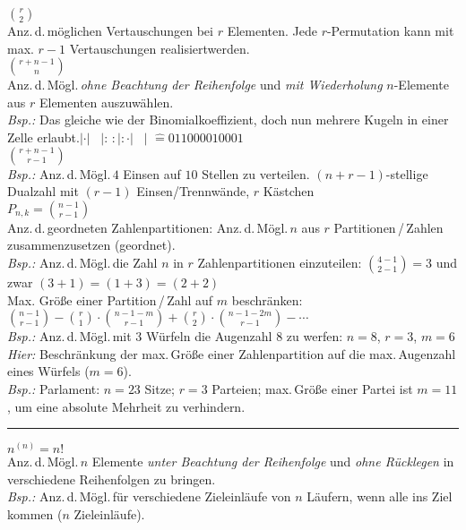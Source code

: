\documentclass[a4paper,10pt,titlepage]{scrartcl}
\begin{document}
$\binom{r}{2}$ \\
Anz.\,d.\,möglichen Vertauschungen bei $r$ Elementen. Jede $r$-Permutation kann mit max. $r-1$ Vertauschungen realisiert\nolinebreak[5] werden.\\

$\binom{r+n-1}{n}$\\
Anz.\,d.\,Mögl.\,\emph{ohne Beachtung der Reihenfolge} und \emph{mit Wiederholung} $n$-Elemente aus $r$ Elementen auszuwählen.\\
\emph{Bsp.:} Das gleiche wie der Binomialkoeffizient, doch nun mehrere Kugeln in einer Zelle erlaubt.\quad $|\cdot|\;\;\;|:\,:|:\cdot|\;\;\;|$ {\fontsize{7pt}{0pt}\selectfont $\mathrel{\widehat{=}} 011000010001$}\\

$\binom{r+n-1}{r-1}$\\
\emph{Bsp.:} Anz.\,d.\,Mögl.\,$4$ Einsen auf $10$ Stellen zu verteilen. $(n+r-1)$-stellige Dualzahl mit $(r-1)$ Einsen/Trennwände, $r$ Kästchen\\

$P_{n,k}=\binom{n-1}{r-1}$\\
Anz.\,d.\,geordneten Zahlenpartitionen: Anz.\,d.\,Mögl.\,$n$ aus $r$ Partitionen\,/\,Zahlen zusammenzusetzen (geordnet).\\
\emph{Bsp.:} Anz.\,d.\,Mögl.\,die Zahl $n$ in $r$ Zahlenpartitionen einzuteilen: $\binom{4-1}{2-1}=3$ und zwar $(3+1)=(1+3)=(2+2)$\medskip\\
\noindent
Max. Größe einer Partition\,/\,Zahl auf $m$ beschränken: $\binom{n-1}{r-1}-\binom{r}{1}\cdot\binom{n-1-m}{r-1}+\binom{r}{2}\cdot\binom{n-1-2m}{r-1}-\cdots$\\
\emph{Bsp.:} Anz.\,d.\,Mögl.\,mit $3$ Würfeln die Augenzahl $8$ zu werfen: $n=8$, $r=3$, $m=6$\\
\emph{Hier:} Beschränkung der max.\,Größe einer Zahlenpartition auf die max.\,Augenzahl eines Würfels ($m=6$).\\
\emph{Bsp.:} Parlament: $n=23$ Sitze; $r=3$ Parteien; max.\,Größe einer Partei ist $m=11$, um eine absolute Mehrheit zu verhindern.
\noindent\rule[3pt]{20.2cm}{0.1mm}

$n^{(n)}=n!$\\
Anz.\,d.\,Mögl.\,$n$ Elemente \emph{unter Beachtung der Reihenfolge} und \emph{ohne Rücklegen} in verschiedene Reihenfolgen zu bringen.\\
\emph{Bsp.:} Anz.\,d.\,Mögl.\,für verschiedene Zieleinläufe von $n$ Läufern, wenn alle ins Ziel kommen ($n$ Zieleinläufe).\\
\end{document}
